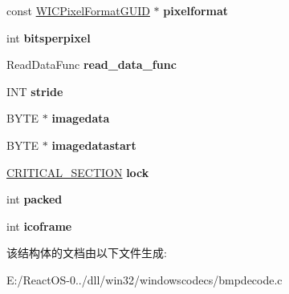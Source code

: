 \begin{DoxyCompactItemize}
const \hyperlink{interface_g_u_i_d}{W\+I\+C\+Pixel\+Format\+G\+U\+ID} $\ast$ {\bfseries pixelformat}
\item 
\mbox{\label{struct_bmp_decoder_ac4ee3c37e668a276c0e97f44f8c435a9}} 
int {\bfseries bitsperpixel}
\item 
\mbox{\label{struct_bmp_decoder_aa585eb3309132f4322a90b7c4b34cfa3}} 
Read\+Data\+Func {\bfseries read\+\_\+data\+\_\+func}
\item 
\mbox{\label{struct_bmp_decoder_a252b729c1f1a897505d7a93173b70665}} 
I\+NT {\bfseries stride}
\item 
\mbox{\label{struct_bmp_decoder_aca9bbd3b3e11fed3bb0b9fc920a6dbbd}} 
B\+Y\+TE $\ast$ {\bfseries imagedata}
\item 
\mbox{\label{struct_bmp_decoder_a5a421d5bdd58f508bd3c414393ebae2b}} 
B\+Y\+TE $\ast$ {\bfseries imagedatastart}
\item 
\mbox{\label{struct_bmp_decoder_ac822c9b5bdf80473c3115ee6be716be2}} 
\hyperlink{struct___c_r_i_t_i_c_a_l___s_e_c_t_i_o_n}{C\+R\+I\+T\+I\+C\+A\+L\+\_\+\+S\+E\+C\+T\+I\+ON} {\bfseries lock}
\item 
\mbox{\label{struct_bmp_decoder_a5a6805e714c0f199b782b7c6fe2a1f39}} 
int {\bfseries packed}
\item 
\mbox{\label{struct_bmp_decoder_a33a3e6c3ba1355eb29d4bdf87c74ca6a}} 
int {\bfseries icoframe}
\end{DoxyCompactItemize}


该结构体的文档由以下文件生成\+:\begin{DoxyCompactItemize}
\item 
E\+:/\+React\+O\+S-\/0../dll/win32/windowscodecs/bmpdecode.\+c\end{DoxyCompactItemize}
